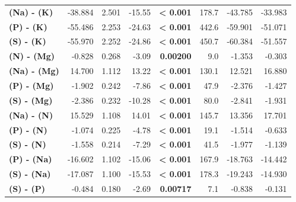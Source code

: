 \begin{table}[H]
\begin{tabular}[t]{>{}lrrr>{}rrrr}
\textbf{(Na) - (K)} & -38.884 & 2.501 & -15.55 & \textbf{< 0.001} & 178.7 & -43.785 & -33.983\\
\textbf{(P) - (K)} & -55.486 & 2.253 & -24.63 & \textbf{< 0.001} & 442.6 & -59.901 & -51.071\\
\textbf{(S) - (K)} & -55.970 & 2.252 & -24.86 & \textbf{< 0.001} & 450.7 & -60.384 & -51.557\\
\textbf{(N) - (Mg)} & -0.828 & 0.268 & -3.09 & \textbf{0.00200} & 9.0 & -1.353 & -0.303\\
\textbf{(Na) - (Mg)} & 14.700 & 1.112 & 13.22 & \textbf{< 0.001} & 130.1 & 12.521 & 16.880\\
\textbf{(P) - (Mg)} & -1.902 & 0.242 & -7.86 & \textbf{< 0.001} & 47.9 & -2.376 & -1.427\\
\textbf{(S) - (Mg)} & -2.386 & 0.232 & -10.28 & \textbf{< 0.001} & 80.0 & -2.841 & -1.931\\
\textbf{(Na) - (N)} & 15.529 & 1.108 & 14.01 & \textbf{< 0.001} & 145.7 & 13.356 & 17.701\\
\textbf{(P) - (N)} & -1.074 & 0.225 & -4.78 & \textbf{< 0.001} & 19.1 & -1.514 & -0.633\\
\textbf{(S) - (N)} & -1.558 & 0.214 & -7.29 & \textbf{< 0.001} & 41.5 & -1.977 & -1.139\\
\textbf{(P) - (Na)} & -16.602 & 1.102 & -15.06 & \textbf{< 0.001} & 167.9 & -18.763 & -14.442\\
\textbf{(S) - (Na)} & -17.087 & 1.100 & -15.53 & \textbf{< 0.001} & 178.3 & -19.243 & -14.930\\
\textbf{(S) - (P)} & -0.484 & 0.180 & -2.69 & \textbf{0.00717} & 7.1 & -0.838 & -0.131\\
\bottomrule
\end{tabular}
\end{table}
